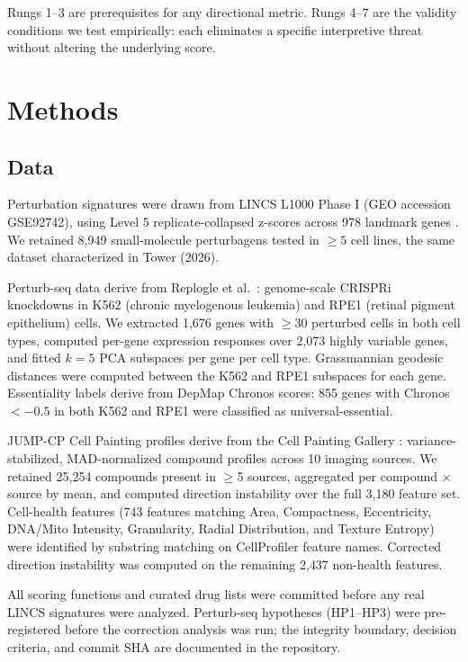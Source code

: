 \documentclass{article}
\begin{document}
Rungs 1--3 are prerequisites for any directional metric. Rungs 4--7 are the
validity conditions we test empirically: each eliminates a specific
interpretive threat without altering the underlying score.

\section{Methods}

\subsection{Data}

Perturbation signatures were drawn from LINCS L1000 Phase I (GEO accession
GSE92742), using Level 5 replicate-collapsed z-scores across 978 landmark
genes \citep{subramanian2017next}. We retained 8{,}949 small-molecule
perturbagens tested in $\geq5$ cell lines, the same dataset characterized in
Tower (2026).

Perturb-seq data derive from Replogle et al.\
\citep{replogle2022mapping}: genome-scale CRISPRi knockdowns in K562
(chronic myelogenous leukemia) and RPE1 (retinal pigment epithelium)
cells. We extracted 1{,}676 genes with $\geq$30 perturbed cells in both
cell types, computed per-gene expression responses over 2{,}073 highly
variable genes, and fitted $k = 5$ PCA subspaces per gene per cell type.
Grassmannian geodesic distances were computed between the K562 and RPE1
subspaces for each gene. Essentiality labels derive from DepMap Chronos
scores: 855 genes with Chronos $< -0.5$ in both K562 and RPE1 were
classified as universal-essential.

JUMP-CP Cell Painting profiles derive from the Cell Painting Gallery
\citep{chandrasekaran2023jump}: variance-stabilized, MAD-normalized
compound profiles across 10 imaging sources. We retained 25{,}254
compounds present in $\geq$5 sources, aggregated per compound $\times$
source by mean, and computed direction instability over the full 3{,}180
feature set. Cell-health features (743 features matching Area, Compactness,
Eccentricity, DNA/Mito Intensity, Granularity, Radial Distribution, and
Texture Entropy) were identified by substring matching on CellProfiler
feature names. Corrected direction instability was computed on the remaining
2{,}437 non-health features.

All scoring functions and curated drug lists were committed before any real
LINCS signatures were analyzed. Perturb-seq hypotheses (HP1--HP3) were
pre-registered before the correction analysis was run; the integrity
boundary, decision criteria, and commit SHA are documented in the
repository.
\end{document}
